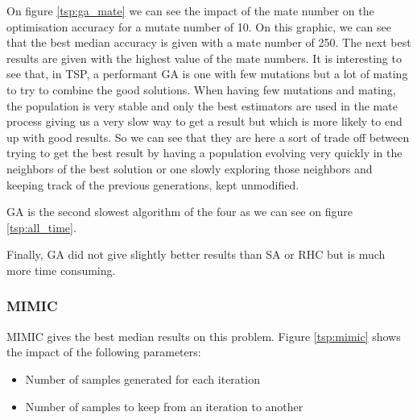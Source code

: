 \documentclass[twocolumn, 10pt]{article}
\begin{document}
				On figure \ref{tsp:ga_mate} we can see the impact of the mate number on the optimisation accuracy for a mutate number of 10. On this graphic, we can see that the best median accuracy is given with a mate number of 250. The next best results are given with the highest value of the mate numbers. It is interesting to see that, in TSP, a performant GA is one with few mutations but a lot of mating to try to combine the good solutions.
				When having few mutations and mating, the population is very stable and only the best estimators are used in the mate process giving us a very slow way to get a result but which is more likely to end up with good results. So we can see that they are here a sort of trade off between trying to get the best result by having a population evolving very quickly in the neighbors of the best solution or one slowly exploring those neighbors and keeping track of the previous generations, kept unmodified.

				GA is the second slowest algorithm of the four as we can see on figure \ref{tsp:all_time}.

				Finally, GA did not give slightly better results than SA or RHC but is much more time consuming.
			\subsubsection*{MIMIC}
				MIMIC gives the best median results on this problem. Figure \ref{tsp:mimic} shows the impact of the following parameters:
				\begin{itemize}
					\item Number of samples generated for each iteration
					\item Number of samples to keep from an iteration to another
				\end{itemize}
\end{document}
